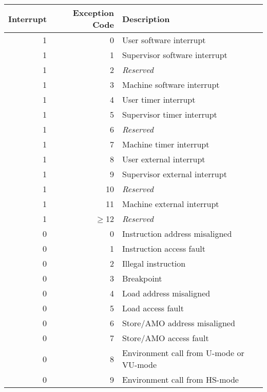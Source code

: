 \begin{table*}[h!]
\begin{center}
\begin{tabular}{|r|r|l|l|}

  \hline
  Interrupt & Exception Code  & Description \\
  \hline
  1         & 0               & User software interrupt \\
  1         & 1               & Supervisor software interrupt \\
  1         & 2               & {\em Reserved} \\
  1         & 3               & Machine software interrupt \\
  1         & 4               & User timer interrupt \\
  1         & 5               & Supervisor timer interrupt \\
  1         & 6               & {\em Reserved} \\
  1         & 7               & Machine timer interrupt \\
  1         & 8               & User external interrupt \\
  1         & 9               & Supervisor external interrupt \\
  1         & 10              & {\em Reserved} \\
  1         & 11              & Machine external interrupt \\
  1         & $\ge$12         & {\em Reserved} \\ \hline
  0         & 0               & Instruction address misaligned \\
  0         & 1               & Instruction access fault \\
  0         & 2               & Illegal instruction \\
  0         & 3               & Breakpoint \\
  0         & 4               & Load address misaligned \\
  0         & 5               & Load access fault \\
  0         & 6               & Store/AMO address misaligned \\
  0         & 7               & Store/AMO access fault \\
  0         & 8               & Environment call from U-mode or VU-mode \\
  0         & 9               & Environment call from HS-mode \\

\end{tabular}
\end{center}
\end{table*}
